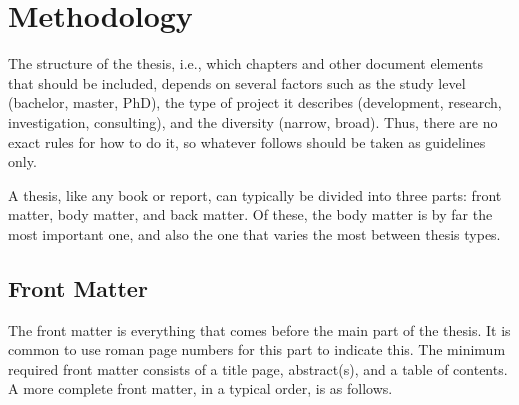 \chapter{Methodology}
\label{chap:methodology}

The structure of the thesis, i.e., which chapters and other document elements that should be included, depends on several factors such as the study level (bachelor, master, PhD), the type of project it describes (development, research, investigation, consulting), and the diversity (narrow, broad). Thus, there are no exact rules for how to do it, so whatever follows should be taken as guidelines only.

A thesis, like any book or report, can typically be divided into three parts: front matter, body matter, and back matter. Of these, the body matter is by far the most important one, and also the one that varies the most between thesis types.

\section{Front Matter}
\label{sec:frontmatter}

The front matter is everything that comes before the main part of the thesis. It is common to use roman page numbers for this part to indicate this. The minimum required front matter consists of a title page, abstract(s), and a table of contents. A more complete front matter, in a typical order, is as follows.

